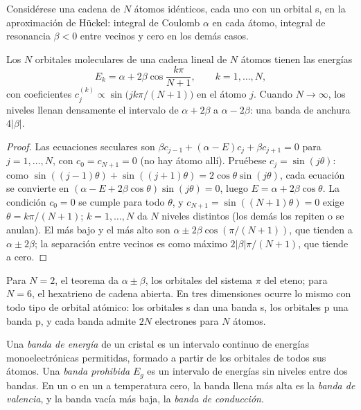 Considérese una cadena de $N$ átomos idénticos, cada uno con un orbital s, en la aproximación
de Hückel: integral de Coulomb $\alpha$ en cada átomo, integral de resonancia $\beta < 0$
entre vecinos y cero en los demás casos.

\begin{theorem}\label{thm:b3:solid-state:chain}
Los $N$ orbitales moleculares de una cadena lineal de $N$ átomos tienen las energías
\[
  E_k = \alpha + 2\beta\cos\frac{k\pi}{N + 1}, \qquad k = 1, \dots, N,
\]
con coeficientes $c_j^{(k)} \propto \sin\bigl(jk\pi/(N + 1)\bigr)$ en el átomo $j$. Cuando $N \to \infty$, los niveles llenan densamente el
intervalo de $\alpha + 2\beta$ a $\alpha - 2\beta$: una banda de anchura $4|\beta|$.
\end{theorem}

\begin{proof}
Las ecuaciones seculares son $\beta c_{j-1} + (\alpha - E)c_j + \beta c_{j+1} = 0$ para $j = 1, \dots, N$, con $c_0 = c_{N+1} = 0$
(no hay átomo allí). Pruébese $c_j = \sin(j\theta)$: como $\sin((j - 1)\theta) + \sin((j + 1)\theta) = 2\cos\theta\sin(j\theta)$, cada
ecuación se convierte en $(\alpha - E + 2\beta\cos\theta)\sin(j\theta) = 0$, luego $E = \alpha + 2\beta\cos\theta$. La condición $c_0 = 0$ se cumple
para todo $\theta$, y $c_{N+1} = \sin((N + 1)\theta) = 0$ exige $\theta = k\pi/(N + 1)$; $k = 1, \dots, N$ da $N$ niveles
distintos (los demás los repiten o se anulan). El más bajo y el más alto son
$\alpha \pm 2\beta\cos(\pi/(N + 1))$, que tienden a $\alpha \pm 2\beta$; la separación entre vecinos es como máximo
$2|\beta|\pi/(N + 1)$, que tiende a cero.
\end{proof}

Para $N = 2$, el teorema da $\alpha \pm \beta$, los orbitales del sistema $\pi$ del eteno; para
$N = 6$, el hexatrieno de cadena abierta. En tres dimensiones ocurre lo mismo con
todo tipo de orbital atómico: los orbitales s dan una banda s, los orbitales p una banda p,
y cada banda admite $2N$ electrones para $N$ átomos.

\begin{definition}[Bandas]\label{def:b3:solid-state:band}
Una \emph{banda de energía} de un cristal es un intervalo continuo de
energías monoelectrónicas permitidas, formado a partir de los orbitales de todos sus átomos. Una
\emph{banda prohibida} $E_g$ es un intervalo de energías sin niveles entre dos
bandas. En un  o en un  a temperatura cero, la banda llena
más alta es la \emph{banda de valencia}, y la banda vacía más baja,
la \emph{banda de conducción}.
\end{definition}

